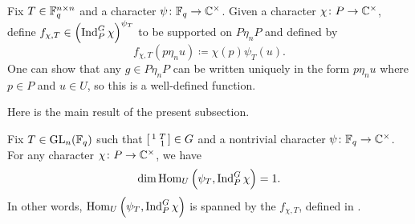\begin{definition}\label{def:produce-psi-t-eigen} %
	Fix $T\in \mathbb F_q^{n\times n}$ and a character $\psi\colon\mathbb F_q\to\mathbb C^\times$. Given a character $\chi\colon P\to\mathbb C^\times$, define $f_{\chi,T}\in\left(\operatorname{Ind}_P^G\chi\right)^{\psi_T}$ to be supported on $P\eta_nP$ and defined by
	\[f_{\chi,T}(p\eta_nu)\coloneqq\chi(p)\psi_T(u).\]
	One can show that any $g\in P\eta_nP$ can be written uniquely in the form $p\eta_nu$ where $p\in P$ and $u\in U$, so this is a well-defined function.
\end{definition} 
Here is the main result of the present subsection.
\begin{proposition} \label{prop:psi-t-mult-one}
	Fix $T\in\mathrm{GL}_n(\mathbb F_q)$ such that $\begin{bsmallmatrix}
		1 & T \\ & 1
	\end{bsmallmatrix}\in G$ and a nontrivial character $\psi\colon\mathbb F_q\to\mathbb C^\times$. For any character $\chi\colon P\to\mathbb C^\times$, we have
	\[\dim\operatorname{Hom}_U\left(\psi_T,\operatorname{Ind}_P^G\chi\right)=1.\]
	In other words, $\operatorname{Hom}_U\left(\psi_T,\operatorname{Ind}_P^G\chi\right)$ is spanned by the $f_{\chi,T}$, defined in .
\end{proposition}
